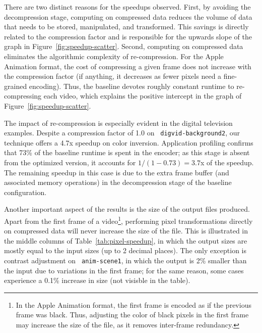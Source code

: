 There are two distinct reasons for the speedups observed.  First, by
avoiding the decompression stage, computing on compressed data reduces
the volume of data that needs to be stored, manipulated, and
transformed.  This savings is directly related to the compression
factor and is responsible for the upwards slope of the graph in
Figure~\ref{fig:speedup-scatter}.  Second, computing on compressed
data eliminates the algorithmic complexity of re-compression.  For the
Apple Animation format, the cost of compressing a given frame does not
increase with the compression factor (if anything, it decreases as
fewer pixels need a fine-grained encoding).  Thus, the baseline
devotes roughly constant runtime to re-compressing each video, which
explains the positive intercept in the graph of
Figure~\ref{fig:speedup-scatter}.

The impact of re-compression is especially evident in the digital
television examples.  Despite a compression factor of 1.0 on {\tt
digvid-background2}, our technique offers a 4.7x speedup on color
inversion.  Application profiling confirms that 
73\% of the baseline runtime is spent in the encoder; as this stage is
absent from the optimized version, it accounts for $1/(1-0.73) = 3.7$x
of the speedup.  The remaining speedup in this case is due to the
extra frame buffer (and associated memory operations) in the
decompression stage of the baseline configuration.
%
%

Another important aspect of the results is the size of the output
files produced.  Apart from the first frame of a video\footnote{In the
Apple Animation format, the first frame is encoded as if the previous
frame was black.  Thus, adjusting the color of black pixels in the
first frame may increase the size of the file, as it removes
inter-frame redundancy.}, performing pixel transformations directly on
compressed data will never increase the size of the file.  This is
illustrated in the middle columns of Table~\ref{tab:pixel-speedup}, in
which the output sizes are mostly equal to the input sizes (up to 2
decimal places).  The only exception is contrast adjustment on {\tt
anim-scene1}, in which the output is 2\% smaller than the input due to
variations in the first frame; for the same reason, some cases
experience a 0.1\% increase in size (not visisble in the table).

